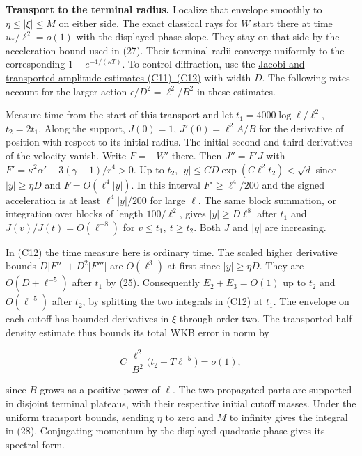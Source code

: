 \documentclass[11pt,a4paper]{article}
\begin{document}
\textbf{Transport to the terminal radius.} Localize that envelope
smoothly to \(\eta\le|\xi|\le M\) on either side. The exact classical
rays for \(W\) start there at time \(u_*/\ell^2=o(1)\) with the
displayed phase slope. They stay on that side by the acceleration bound
used in (27). Their terminal radii converge uniformly to the
corresponding \(1\pm e^{-1/(\kappa T)}\). To control diffraction, use
the
\href{balaban-ode-lesson.md\#quantum-transport-through-the-circle}{Jacobi
and transported-amplitude estimates (C11)--(C12)} with width \(D\). The
following rates account for the larger action
\(\epsilon/D^2=\ell^2/B^2\) in these estimates.

Measure time from the start of this transport and let
\(t_1=4000\log\ell/\ell^2\), \(t_2=2t_1\). Along the support,
\(J(0)=1\), \(J'(0)=\ell^2 A/B\) for the derivative of position with
respect to its initial radius. The initial second and third derivatives
of the velocity vanish. Write \(F=-W'\) there. Then \(J''=F'J\) with
\(F'=\kappa^2\alpha'-3(\gamma-1)/r^4>0\). Up to \(t_2\),
\(|y|\le CD\exp(C\ell^2t_2)<\sqrt d\) since \(|y|\ge\eta D\) and
\(F=O(\ell^4 |y|)\). In this interval \(F'\ge\ell^4/200\) and the signed
acceleration is at least \(\ell^4|y|/200\) for large \(\ell\). The same
block summation, or integration over blocks of length \(100/\ell^2\),
gives \(|y|\ge D\ell^8\) after \(t_1\) and \(J(v)/J(t)=O(\ell^{-8})\)
for \(v\le t_1,\ t\ge t_2\). Both \(J\) and \(|y|\) are increasing.

In (C12) the time measure here is ordinary time. The scaled higher
derivative bounds \(D|F''|+D^2|F'''|\) are \(O(\ell^3)\) at first since
\(|y|\ge\eta D\). They are \(O(D+\ell^{-5})\) after \(t_1\) by (25).
Consequently \(E_2+E_3=O(1)\) up to \(t_2\) and \(O(\ell^{-5})\) after
\(t_2\), by splitting the two integrals in (C12) at \(t_1\). The
envelope on each cutoff has bounded derivatives in \(\xi\) through order
two. The transported half-density estimate thus bounds its total WKB
error in norm by

\[
 C\,\frac{\ell^2}{B^2}\big(t_2+T\ell^{-5}\big)=o(1),
\]

since \(B\) grows as a positive power of \(\ell\). The two propagated
parts are supported in disjoint terminal plateaus, with their respective
initial cutoff masses. Under the uniform transport bounds, sending
\(\eta\) to zero and \(M\) to infinity gives the integral in (28).
Conjugating momentum by the displayed quadratic phase gives its spectral
form.
\end{document}
